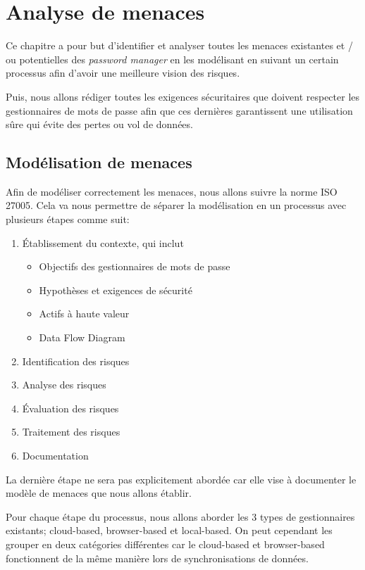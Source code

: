 
\chapter{Analyse de menaces}
\label{ch:analyse_menaces}

Ce chapitre a pour but d'identifier et analyser toutes les menaces existantes et / ou potentielles des \textit{password manager} en les modélisant en suivant un certain processus afin d'avoir une meilleure vision des risques.

Puis, nous allons rédiger toutes les exigences sécuritaires que doivent respecter les gestionnaires de mots de passe afin que ces dernières garantissent une utilisation sûre qui évite des pertes ou vol de données.

\section{Modélisation de menaces}
Afin de modéliser correctement les menaces, nous allons suivre la norme ISO 27005\cite{ISO27005}. Cela va nous permettre de séparer la modélisation en un processus avec plusieurs étapes comme suit:

\begin{enumerate}
	\item Établissement du contexte, qui inclut
	\begin{itemize}
		\item Objectifs des gestionnaires de mots de passe
		\item Hypothèses et exigences de sécurité
		\item Actifs à haute valeur 
		\item Data Flow Diagram
	\end{itemize}
	\item Identification des risques
	\item Analyse des risques
	\item Évaluation des risques
	\item Traitement des risques
	\item Documentation 
\end{enumerate}
La dernière étape ne sera pas explicitement abordée car elle vise à documenter le modèle de menaces que nous allons établir.

Pour chaque étape du processus, nous allons aborder les 3 types de gestionnaires existants; cloud-based, browser-based et local-based. On peut cependant les grouper en deux catégories différentes car le cloud-based et browser-based fonctionnent de la même manière lors de synchronisations de données.

